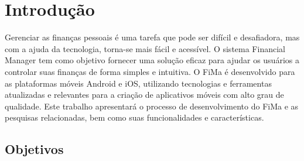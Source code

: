% 

\chapter[Introdução]{Introdução}

Gerenciar as finanças pessoais é uma tarefa que pode ser difícil e desafiadora, mas com a ajuda da tecnologia, torna-se mais fácil e acessível. O sistema Financial Manager tem como objetivo fornecer uma solução eficaz para ajudar os usuários a controlar suas finanças de forma simples e intuitiva. O FiMa é desenvolvido para as plataformas móveis Android e iOS, utilizando tecnologias e ferramentas atualizadas e relevantes para a criação de aplicativos móveis com alto grau de qualidade. Este trabalho apresentará o processo de desenvolvimento do FiMa e as pesquisas relacionadas, bem como suas funcionalidades e características.

\section{Objetivos}


